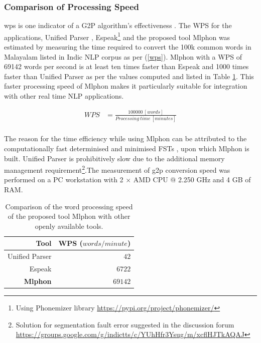 \subsubsection{Comparison of Processing Speed}

\Gls{wps} is one indicator of a G2P algorithm's effectiveness
\cite{mdpi2022ruleg2p}. The WPS for the applications, Unified Parser
\cite{baby2016unified}, Espeak\footnote{Using Phonemizer library
	\url{https://pypi.org/project/phonemizer/}} and the proposed tool Mlphon was
estimated by measuring the time required to convert the 100k common words in
Malayalam listed in Indic NLP corpus \cite{kunchukuttan2020ai4bharat} as per
(\ref{wps}). Mlphon with a WPS of 69142 words per second is at least ten times
faster than Espeak and 1000 times faster than Unified Parser as per the values
computed and listed in Table \ref{tab:speed}. This faster processing speed of
Mlphon makes it particularly suitable for integration with other real time NLP
applications.

\begin{equation}
	\label{wps}
	\begin{split}
		WPS & =\frac{100000\ [words]}{Processing\ time\ [minutes]}  \\
	\end{split}
\end{equation}

The reason for the time efficiency while using Mlphon can be attributed to the
computationally fast determinised and minimised FSTs \cite{mohri-1997-finite},
upon which Mlphon is built. Unified Parser is prohibitively slow due to the
additional memory management requirement\footnote{Solution for segmentation
	fault error suggested in the discussion forum
	\url{https://groups.google.com/g/indictts/c/YUhHfr3Ysug/m/xcflHJTkAQAJ}}.The
measurement of \gls{g2p} conversion speed was performed on a PC
workstation with 2 $\times$ AMD CPU @ 2.250 GHz and 4 GB of RAM. %

\begin{table}[ht]
	\centering

	\caption{Comparison of the word processing speed of the proposed tool Mlphon with other openly available tools.}
	\label{tab:speed}
	\begin{tabular}{r|r}
		\hline \hline
		Tool            & WPS ($words/minute$) \\ \hline
		Unified Parser  & $42$                     \\
		Espeak          & $6722$                   \\
		\textbf{Mlphon} & $69142$         \\
		\hline
	\end{tabular}
\end{table}

